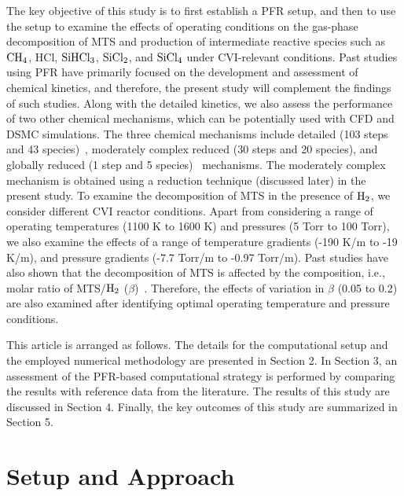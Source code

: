 \documentclass[final, letterpaper, square, comma, numbers, sort&compress]{elsarticle}
\begin{document}
The key objective of this study is to first establish a PFR setup, and then to use the setup to examine the effects of operating conditions on the gas-phase decomposition of MTS and production of intermediate reactive species such as $\rm CH_4$, HCl, $\rm SiHCl_3$, $\rm SiCl_2$, and $\rm SiCl_4$ under CVI-relevant conditions. Past studies using PFR have primarily focused on the development and assessment of chemical kinetics, and therefore, the present study will complement the findings of such studies. Along with the detailed kinetics, we also assess the performance of two other chemical mechanisms, which can be potentially used with CFD and DSMC simulations. The three chemical mechanisms include detailed (103 steps and 43 species)~\cite{Ge2007A,Ge2007B,Ge2010}, moderately complex reduced (30 steps and 20 species), and globally reduced (1 step and 5 species)~\cite{Mousavipour2004} mechanisms. The moderately complex mechanism is obtained using a reduction technique (discussed later) in the present study. To examine the decomposition of MTS in the presence of $\rm H_2$, we consider different CVI reactor conditions. Apart from considering a range of operating temperatures (1100 K to 1600 K) and pressures (5 Torr to 100 Torr), we also examine the effects of a range of temperature gradients (-190 K/m to -19 K/m), and pressure gradients (-7.7 Torr/m to -0.97 Torr/m). Past studies have also shown that the decomposition of MTS is affected by the composition, i.e., molar ratio of MTS/$\rm H_2$ ($\beta$)~\cite{Peng2021}. Therefore, the effects of variation in $\beta$ (0.05 to 0.2) are also examined after identifying optimal operating temperature and pressure conditions. 

This article is arranged as follows. The details for the computational setup and the employed numerical methodology are presented in Section 2. In Section 3, an assessment of the PFR-based computational strategy is performed by comparing the results with reference data from the literature. The results of this study are discussed in Section 4. Finally, the key outcomes of this study are summarized in Section 5.

\section{Setup and Approach}
\label{S:2}
\end{document}
